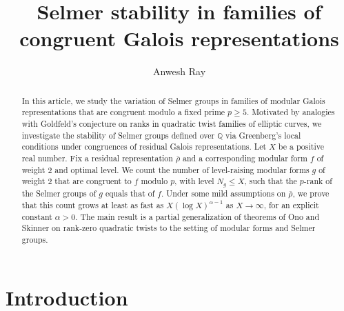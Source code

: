 \documentclass[table]{amsart}
\newcommand{\Q}{\mathbb{Q}}
\numberwithin{equation}{section}
\begin{document}
\title[Selmer stability of congruent Galois representations]{Selmer stability in families of congruent Galois representations}



\author[A.~Ray]{Anwesh Ray}
\address[Ray]{Chennai Mathematical Institute, H1, SIPCOT IT Park, Kelambakkam, Siruseri, Tamil Nadu 603103, India}




\maketitle

\begin{abstract}
In this article, we study the variation of Selmer groups in families of modular Galois representations that are congruent modulo a fixed prime $p \geq 5$. Motivated by analogies with Goldfeld’s conjecture on ranks in quadratic twist families of elliptic curves, we investigate the stability of Selmer groups defined over $\Q$ via Greenberg's local conditions under congruences of residual Galois representations. Let $X$ be a positive real number. Fix a residual representation $\bar{\rho}$ and a corresponding modular form $f$ of weight $2$ and optimal level. We count the number of level-raising modular forms $g$ of weight $2$ that are congruent to $f$ modulo $p$, with level $N_g\leq X$, such that the $p$-rank of the Selmer groups of $g$ equals that of $f$. Under some mild assumptions on $\bar{\rho}$, we prove that this count grows at least as fast as $X (\log X)^{\alpha - 1}$ as $X \to \infty$, for an explicit constant $\alpha > 0$. The main result is a partial generalization of theorems of Ono and Skinner on rank-zero quadratic twists to the setting of modular forms and Selmer groups.
\end{abstract}

\section{Introduction}
\end{document}
